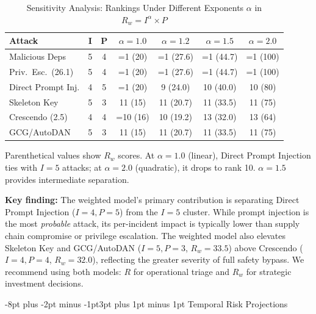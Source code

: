 \documentclass[conference]{IEEEtran}
\makeatletter
\renewcommand{\subsection}{\@startsection{subsection}{2}{\z@}%
  {-8pt plus -2pt minus -1pt}{3pt plus 1pt minus 1pt}%
  {\normalfont\normalsize\bfseries\sffamily\color{accentblue}}}
\newcommand{\tableheaderrow}{\rowcolor{accentblue}}
\renewcommand{\thead}[1]{\textbf{\color{white}\sffamily #1}}
\makeatother
\begin{document}
\begin{table}[!htbp]
\centering
\caption{Sensitivity Analysis: Rankings Under Different Exponents $\alpha$ in $R_w = I^{\alpha} \times P$}
\label{tab:sensitivity}
\renewcommand{\arraystretch}{1.05}
\scriptsize\sffamily
\begin{tabular}{p{2.0cm}cccccc}
\toprule
\tableheaderrow \thead{Attack} & \thead{I} & \thead{P} & \thead{$\alpha{=}1.0$} & \thead{$\alpha{=}1.2$} & \thead{$\alpha{=}1.5$} & \thead{$\alpha{=}2.0$} \\
\midrule
\rowcolor{rowalt} Malicious Deps & 5 & 4 & =1 (20) & =1 (27.6) & =1 (44.7) & =1 (100) \\
Priv.\ Esc.\ (26.1) & 5 & 4 & =1 (20) & =1 (27.6) & =1 (44.7) & =1 (100) \\
\rowcolor{rowalt} Direct Prompt Inj. & 4 & 5 & =1 (20) & 9 (24.0) & 10 (40.0) & 10 (80) \\
Skeleton Key & 5 & 3 & 11 (15) & 11 (20.7) & 11 (33.5) & 11 (75) \\
\rowcolor{rowalt} Crescendo (2.5) & 4 & 4 & =10 (16) & 10 (19.2) & 13 (32.0) & 13 (64) \\
GCG/AutoDAN & 5 & 3 & 11 (15) & 11 (20.7) & 11 (33.5) & 11 (75) \\
\bottomrule
\end{tabular}
\par\vspace{3pt}
{\scriptsize\sffamily\color{gray} Parenthetical values show $R_w$ scores. At $\alpha{=}1.0$ (linear), Direct Prompt Injection ties with $I{=}5$ attacks; at $\alpha{=}2.0$ (quadratic), it drops to rank 10. $\alpha{=}1.5$ provides intermediate separation.}
\end{table}

\textbf{Key finding:} The weighted model's primary contribution is separating Direct Prompt Injection ($I{=}4, P{=}5$) from the $I{=}5$ cluster. While prompt injection is the most \textit{probable} attack, its per-incident impact is typically lower than supply chain compromise or privilege escalation. The weighted model also elevates Skeleton Key and GCG/AutoDAN ($I{=}5, P{=}3$, $R_w{=}33.5$) above Crescendo ($I{=}4, P{=}4$, $R_w{=}32.0$), reflecting the greater severity of full safety bypass. We recommend using both models: $R$ for operational triage and $R_w$ for strategic investment decisions.

\subsection{Temporal Risk Projections}
\end{document}

